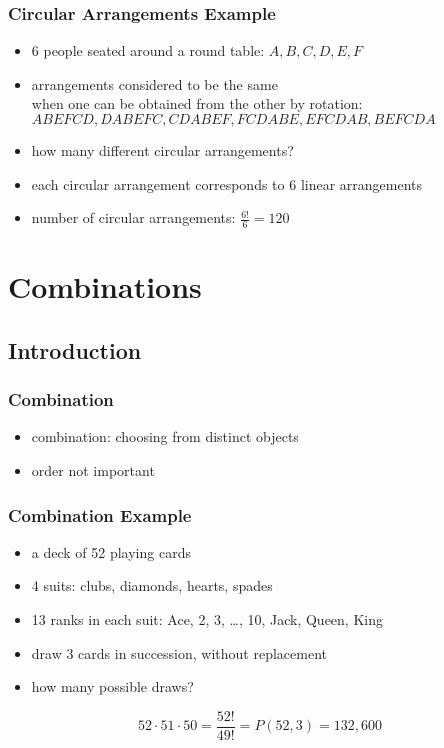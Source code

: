 \documentclass[dvipsnames]{beamer}
\begin{document}

\begin{frame}
  \frametitle{Circular Arrangements Example}

  \begin{itemize}
    \item 6 people seated around a round table: $A,B,C,D,E,F$
    \item arrangements considered to be the same\\
      when one can be obtained from the other by rotation:\\
      \smallskip
      $ABEFCD, DABEFC, CDABEF, FCDABE, EFCDAB, BEFCDA$
    \item how many different circular arrangements?

    \pause
    \medskip
    \item each circular arrangement corresponds to 6 linear arrangements
    \item number of circular arrangements: $\frac{6!}{6} = 120$
  \end{itemize}
\end{frame}

\section{Combinations}

\subsection{Introduction}

\begin{frame}
  \frametitle{Combination}

  \begin{itemize}
    \item \alert{combination}: choosing from distinct objects
    \item order not important
  \end{itemize}
\end{frame}

\begin{frame}
  \frametitle{Combination Example}

  \begin{itemize}
    \item a deck of 52 playing cards
    \item 4 suits: clubs, diamonds, hearts, spades
    \item 13 ranks in each suit: Ace, 2, 3, \ldots, 10, Jack, Queen, King
    \item draw 3 cards in succession, without replacement
    \item how many possible draws?
  \end{itemize}

  \pause
  \begin{equation*}
    52 \cdot 51 \cdot 50 = \frac{52!}{49!} = P(52,3) = 132,600
  \end{equation*}
\end{frame}
\end{document}
